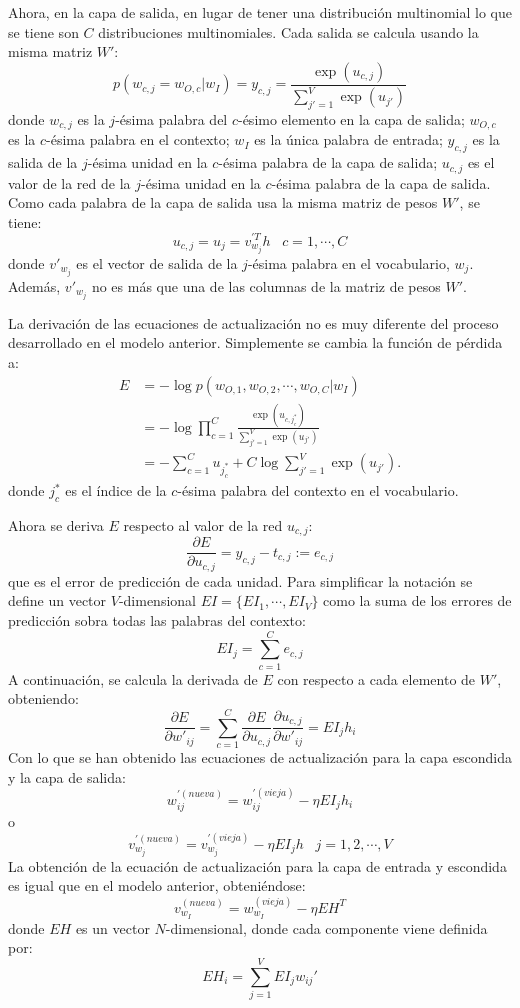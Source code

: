 Ahora, en la capa de salida, en lugar de tener una distribución multinomial lo que se tiene son $C$ distribuciones
multinomiales. Cada salida se calcula usando la misma matriz $W'$:
\[
  p\left( w_{c,j} = w_{O,c} | w_I \right) = y_{c,j} = \frac{\exp(u_{c,j})}{\sum_{j'=1}^V\exp(u_{j'})}
\]
donde $w_{c,j}$ es la $j$-ésima palabra del $c$-ésimo elemento en la capa de salida; $w_{O,c}$ es la $c$-ésima
palabra en el contexto; $w_I$ es la única palabra de entrada; $y_{c,j}$ es la salida de la $j$-ésima unidad en la $c$-ésima
palabra de la capa de salida; $u_{c,j}$ es el valor de la red de la $j$-ésima unidad en la $c$-ésima palabra de la capa de salida.
Como cada palabra de la capa de salida usa la misma matriz de pesos $W'$, se tiene:
\[
  u_{c,j} = u_j = v^{'T}_{w_j}h \;\;\; c=1,\cdots, C
\]
donde $v'_{w_j}$ es el vector de salida de la $j$-ésima palabra en el vocabulario, $w_j$. Además, $v'_{w_j}$ no es más que una de las
columnas de la matriz de pesos $W'$.

La derivación de las ecuaciones de actualización no es muy diferente del proceso desarrollado en el modelo anterior. Simplemente se cambia la función de pérdida a:
\begin{align}
  E & = - \log p\left( w_{O,1}, w_{O,2}, \cdots, w_{O,C} | w_I \right) \\
    & = - \log \prod_{c=1}^C \frac{\exp(u_{c,j_c^*})}{\sum_{j'=1}^V\exp(u_{j'})} \\
    & = - \sum_{c=1}^C u_{j^*_c} + C\log \sum_{j'=1}^V\exp(u_{j'}).
\end{align}
donde $j_c^*$ es el índice de la $c$-ésima palabra del contexto en el vocabulario.

Ahora se deriva $E$ respecto al valor de la red $u_{c,j}$:
\[
  \frac{\partial E}{\partial u_{c,j}} = y_{c,j} - t_{c,j} := e_{c,j}
\]
que es el error de predicción de cada unidad. Para simplificar la notación se define un vector $V$-dimensional $EI=\{EI_1, \cdots, EI_V\}$ como la suma de los errores de
predicción sobra todas las palabras del contexto:
\[
  EI_j = \sum_{c=1}^C e_{c,j}
\]
A continuación, se calcula la derivada de $E$ con respecto a cada elemento de $W'$, obteniendo:
\[
  \frac{\partial E}{\partial w'_{ij}} = \sum_{c=1}^C \frac{\partial E}{\partial u_{c,j}} \frac{\partial u_{c,j}}{\partial w'_{ij}} = EI_j h_i
\]
Con lo que se han obtenido las ecuaciones de actualización para la capa escondida y la capa de salida:
\[
w_{ij}^{'(nueva)} = w_{ij}^{'(vieja)} - \eta EI_j h_i
\]
o
\[
  v_{w_{j}}^{'(nueva)}= v_{w_j}^{'(vieja)} - \eta EI_j h \;\;\; j = 1,2, \cdots, V
\]
La obtención de la ecuación de actualización para la capa de entrada y escondida es igual que en el modelo anterior, obteniéndose:
\[
  v_{w_I}^{(nueva)} = w_{w_I}^{(vieja)} - \eta EH^T
\]
donde $EH$ es un vector $N$-dimensional, donde cada componente viene definida por:
\[
  EH_i = \sum_{j=1}^V EI_j w_{ij}'
\]